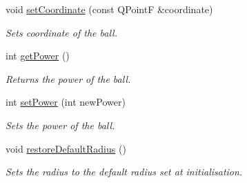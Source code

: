 \begin{DoxyCompactItemize}
\item 
void \hyperlink{class_ball_a69b5819e8b0b441f0412762ab2e0e3db}{set\+Coordinate} (const Q\+Point\+F \&coordinate)
\begin{DoxyCompactList}\small\item\em Sets coordinate of the ball. \end{DoxyCompactList}\item 
int \hyperlink{class_ball_a075ae9c0cb4d07a368aab11538196657}{get\+Power} ()
\begin{DoxyCompactList}\small\item\em Returns the power of the ball. \end{DoxyCompactList}\item 
int \hyperlink{class_ball_a7915b97921a5aeb5885988689de34306}{set\+Power} (int new\+Power)
\begin{DoxyCompactList}\small\item\em Sets the power of the ball. \end{DoxyCompactList}\item 
void \hyperlink{class_ball_a01c8296409b7ab1a4656bdaf69a8d792}{restore\+Default\+Radius} ()
\begin{DoxyCompactList}\small\item\em Sets the radius to the default radius set at initialisation. \end{DoxyCompactList}\end{DoxyCompactItemize}
